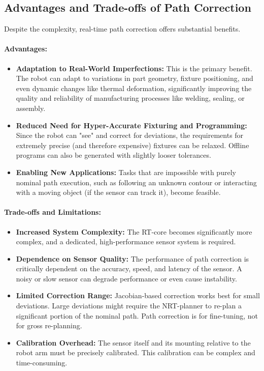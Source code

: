 \subsection{Advantages and Trade-offs of Path Correction}
\label{subsec:path_correction_tradeoffs}

Despite the complexity, real-time path correction offers substantial benefits.

\paragraph{Advantages:}
\begin{itemize}
    \item \textbf{Adaptation to Real-World Imperfections:} This is the primary benefit. The robot can adapt to variations in part geometry, fixture positioning, and even dynamic changes like thermal deformation, significantly improving the quality and reliability of manufacturing processes like welding, sealing, or assembly.
    \item \textbf{Reduced Need for Hyper-Accurate Fixturing and Programming:} Since the robot can "see" and correct for deviations, the requirements for extremely precise (and therefore expensive) fixtures can be relaxed. Offline programs can also be generated with slightly looser tolerances.
    \item \textbf{Enabling New Applications:} Tasks that are impossible with purely nominal path execution, such as following an unknown contour or interacting with a moving object (if the sensor can track it), become feasible.
\end{itemize}

\paragraph{Trade-offs and Limitations:}
\begin{itemize}
    \item \textbf{Increased System Complexity:} The RT-core becomes significantly more complex, and a dedicated, high-performance sensor system is required.
    \item \textbf{Dependence on Sensor Quality:} The performance of path correction is critically dependent on the accuracy, speed, and latency of the sensor. A noisy or slow sensor can degrade performance or even cause instability.
    \item \textbf{Limited Correction Range:} Jacobian-based correction works best for small deviations. Large deviations might require the NRT-planner to re-plan a significant portion of the nominal path. Path correction is for fine-tuning, not for gross re-planning.
    \item \textbf{Calibration Overhead:} The sensor itself and its mounting relative to the robot arm must be precisely calibrated. This calibration can be complex and time-consuming.
\end{itemize}

